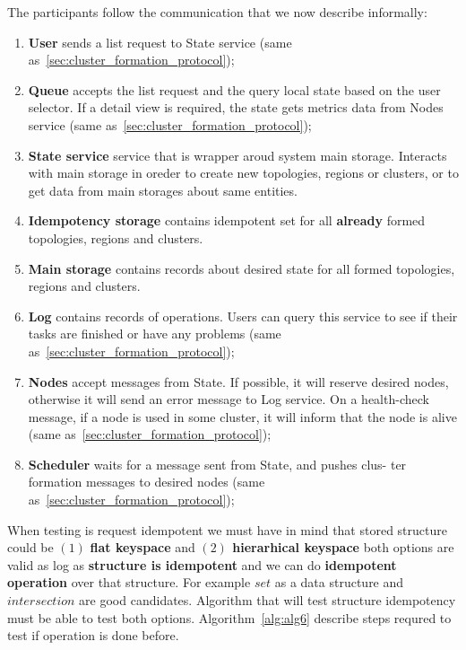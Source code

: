 The participants follow the communication that we now describe informally: \label{informal_description_idempotency}
\begin{enumerate}[start=1,label={(\bfseries \arabic*)}]
	\item \textbf{User} sends a list request to State service (same as~\ref{sec:cluster_formation_protocol});
	\item \textbf{Queue} accepts the list request and the query local state based on the user selector. If a detail view is required, the state gets metrics data from Nodes service (same as~\ref{sec:cluster_formation_protocol});
	\item \textbf{State service} service that is wrapper aroud system main storage. Interacts with main storage in oreder to create new topologies, regions or clusters, or to get data from main storages about same entities.
	\item \textbf{Idempotency storage} contains idempotent set for all \textbf{already} formed topologies, regions and clusters.
	\item \textbf{Main storage} contains records about desired state for all formed topologies, regions and clusters.
	\item \textbf{Log} contains records of operations. Users can query this service to see if their tasks are finished or have any problems (same as~\ref{sec:cluster_formation_protocol});
	\item \textbf{Nodes} accept messages from State. If possible, it will reserve desired nodes, otherwise it will send an error message to Log service. On a health-check message, if a node is used in some cluster, it will inform that the node is alive (same as~\ref{sec:cluster_formation_protocol});
	\item \textbf{Scheduler} waits for a message sent from State, and pushes clus- ter formation messages to desired nodes (same as~\ref{sec:cluster_formation_protocol});
\end{enumerate}

When testing is request idempotent we must have in mind that stored structure could be $(1)$ \textbf{flat keyspace} and \textbf{$(2)$ hierarhical keyspace} both options are valid as log as \textbf{structure is idempotent} and we can do \textbf{idempotent operation} over that structure. For example $set$ as a data structure and $intersection$ are good candidates. Algorithm that will test structure idempotency must be able to test both options. Algorithm~\ref{alg:alg6} describe steps requred to test if operation is done before.

